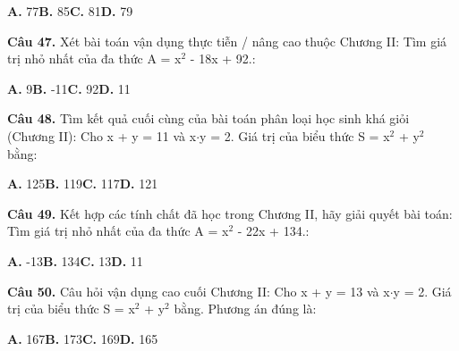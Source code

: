 \documentclass[11pt,a4paper]{article}
\begin{document}
\hspace*{1.5em}\textbf{A.} 77\quad\quad \textbf{B.} 85\quad\quad \textbf{C.} 81\quad\quad \textbf{D.} 79\par\vspace{2pt}
\textbf{\color{primary} Câu 47.} Xét bài toán vận dụng thực tiễn / nâng cao thuộc Chương II: Tìm giá trị nhỏ nhất của đa thức A = x$^2$ - 18x + 92.:\par
\hspace*{1.5em}\textbf{A.} 9\quad\quad \textbf{B.} -11\quad\quad \textbf{C.} 92\quad\quad \textbf{D.} 11\par\vspace{2pt}
\textbf{\color{primary} Câu 48.} Tìm kết quả cuối cùng của bài toán phân loại học sinh khá giỏi (Chương II): Cho x + y = 11 và x$\cdot$y = 2. Giá trị của biểu thức S = x$^2$ + y$^2$ bằng:\par
\hspace*{1.5em}\textbf{A.} 125\quad\quad \textbf{B.} 119\quad\quad \textbf{C.} 117\quad\quad \textbf{D.} 121\par\vspace{2pt}
\textbf{\color{primary} Câu 49.} Kết hợp các tính chất đã học trong Chương II, hãy giải quyết bài toán: Tìm giá trị nhỏ nhất của đa thức A = x$^2$ - 22x + 134.:\par
\hspace*{1.5em}\textbf{A.} -13\quad\quad \textbf{B.} 134\quad\quad \textbf{C.} 13\quad\quad \textbf{D.} 11\par\vspace{2pt}
\textbf{\color{primary} Câu 50.} Câu hỏi vận dụng cao cuối Chương II: Cho x + y = 13 và x$\cdot$y = 2. Giá trị của biểu thức S = x$^2$ + y$^2$ bằng. Phương án đúng là:\par
\hspace*{1.5em}\textbf{A.} 167\quad\quad \textbf{B.} 173\quad\quad \textbf{C.} 169\quad\quad \textbf{D.} 165\par\vspace{2pt}
\end{document}
